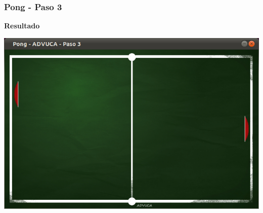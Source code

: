 \begin{frame}
	\frametitle{Pong - Paso 3}
	
    \begin{center}
        \textbf{Resultado}
    \end{center}
	
    \begin{center}
		\includegraphics[scale=0.4]{img/pong-advuca-3.png}
	\end{center}	

\end{frame}

